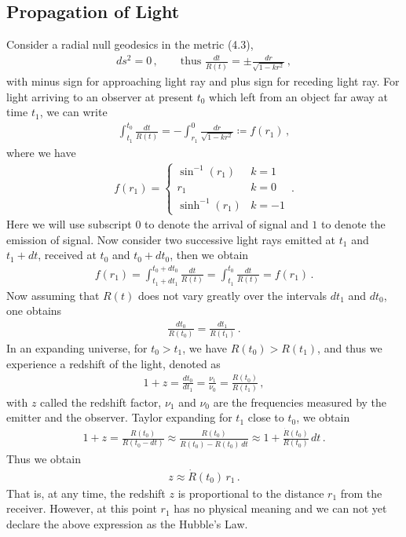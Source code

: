 \documentclass[11pt, onesided]{book}
\theoremstyle{break}
\theoremstyle{break}
\begin{document}
\subsection{Propagation of Light}
Consider a radial null geodesics in the metric (4.3), 
\begin{align*}
ds^2 = 0 \,,\qquad\text{thus }
\frac{dt}{R(t)} = \pm \frac{dr}{\sqrt{1- kr^2}}\,,
\end{align*}
with minus sign for approaching light ray and plus sign for receding light ray. For light arriving to an observer at present $t_0$ which left from an object far away at time $t_1$, we can write
\begin{align*}
\int_{t_1}^{t_0} \frac{dt}{R(t)} = -\int_{r_1}^0 \frac{dr}{\sqrt{1-kr^2}} \coloneqq f(r_1)\,,
\end{align*}
where we have
\begin{align*}
f(r_1) = \begin{cases}
\sin^{-1}(r_1)  & k=1\\
r_1 & k = 0\\
\sinh^{-1}(r_1) & k=-1
\end{cases}\,.
\end{align*}
Here we will use subscript $0$ to denote the arrival of signal and $1$ to denote the emission of signal. Now consider two successive light rays emitted at $t_1$ and $t_1 + dt$, received at $t_0$ and $t_0 + dt_0$, then we obtain
\begin{align*}
f(r_1) = \int_{t_1+dt_1}^{t_0 + dt_0} \frac{dt}{R(t)} = \int_{t_1}^{t_0}\frac{dt}{R(t)} = f(r_1)\,.
\end{align*}
Now assuming that $R(t)$ does not vary greatly over the intervals $dt_1$ and $dt_0$, one obtains
\begin{align*}
\frac{dt_0}{R(t_0)} = \frac{dt_1}{R(t_1)}\,.
\end{align*}
In an expanding universe, for $t_0 > t_1$, we have $R(t_0) > R(t_1)$, and thus we experience a redshift of the light, denoted as
\begin{align*}
1+ z = \frac{dt_0}{dt_1} = \frac{\nu_1}{\nu_0} = \frac{R(t_0)}{R(t_1)}\,,
\end{align*}
with $z$ called the redshift factor, $\nu_1$ and $\nu_0$ are the frequencies measured by the emitter and the observer. Taylor expanding for $t_1$ close to $t_0$, we obtain
\begin{align*}
1+z = \frac{R(t_0)}{R(t_0 - dt)} \approx \frac{R(t_0)}{R(t_0) - \dot{R}(t_0) \, dt} \approx 1 + \frac{\dot{R}(t_0)}{R(t_0)}\, dt\,.
\end{align*}
Thus we obtain
\begin{align*}
z \approx \dot{R}(t_0) \, r_1\,.
\end{align*}
That is, at any time, the redshift $z$ is proportional to the distance $r_1$ from the receiver. However, at this point $r_1$ has no physical meaning and we can not yet declare the above expression as the Hubble's Law. 
\end{document}
